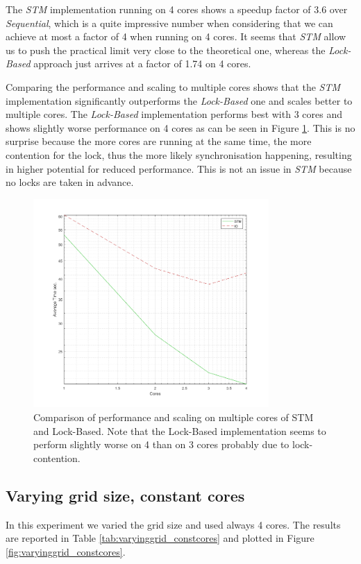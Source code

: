The \textit{STM} implementation running on 4 cores shows a speedup factor of 3.6 over \textit{Sequential}, which is a quite impressive number when considering that we can achieve at most a factor of 4 when running on 4 cores. It seems that \textit{STM} allow us to push the practical limit very close to the theoretical one, whereas the \textit{Lock-Based} approach just arrives at a factor of 1.74 on 4 cores.

Comparing the performance and scaling to multiple cores shows that the \textit{STM} implementation significantly outperforms the \textit{Lock-Based} one and scales better to multiple cores. The \textit{Lock-Based} implementation performs best with 3 cores and shows slightly worse performance on 4 cores as can be seen in Figure \ref{fig:core_duration_stm_io}. This is no surprise because the more cores are running at the same time, the more contention for the lock, thus the more likely synchronisation happening, resulting in higher potential for reduced performance. This is not an issue in \textit{STM} because no locks are taken in advance. 

\begin{figure}
	\centering
	\includegraphics[width=0.8\textwidth, angle=0]{./fig/concurrentabs/sir/core_duration_stm_io.png}
	\caption{Comparison of performance and scaling on multiple cores of STM and Lock-Based. Note that the Lock-Based implementation seems to perform slightly worse on 4 than on 3 cores probably due to lock-contention.}
	\label{fig:core_duration_stm_io}
\end{figure}

\subsection{Varying grid size, constant cores}
In this experiment we varied the grid size and used always 4 cores. The results are reported in Table \ref{tab:varyinggrid_constcores} and plotted in Figure \ref{fig:varyinggrid_constcores}.

